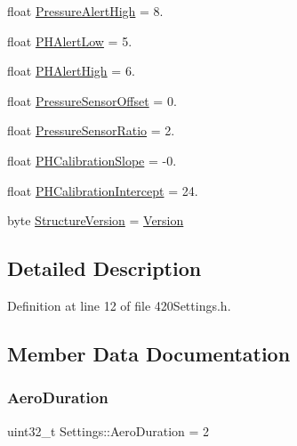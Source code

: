 \begin{DoxyCompactItemize}
\item 
float \mbox{\hyperlink{struct_settings_a8626ef35c32fefa3641eda2a0870e752}{Pressure\+Alert\+High}} = 8.
\item 
float \mbox{\hyperlink{struct_settings_a07b5f64fee695eab010c9e2e253cd683}{P\+H\+Alert\+Low}} = 5.
\item 
float \mbox{\hyperlink{struct_settings_a0b23f8b8b2d5d18b7b5a7b7802e98ce2}{P\+H\+Alert\+High}} = 6.
\item 
float \mbox{\hyperlink{struct_settings_acb268b606c3cf0917fb01044e051a112}{Pressure\+Sensor\+Offset}} = 0.
\item 
float \mbox{\hyperlink{struct_settings_af304b26ec1fe942717219db3fe959b4e}{Pressure\+Sensor\+Ratio}} = 2.
\item 
float \mbox{\hyperlink{struct_settings_af42cd4f0378498410447b2da93c0517f}{P\+H\+Calibration\+Slope}} = -\/0.
\item 
float \mbox{\hyperlink{struct_settings_a293248c61a8ef83275ab2881db22aa01}{P\+H\+Calibration\+Intercept}} = 24.
\item 
byte \mbox{\hyperlink{struct_settings_a923d0e7c37322a666726a4ca40b14aad}{Structure\+Version}} = \mbox{\hyperlink{420_settings_8h_a90337a28eda4a299ae1c1953e4440674}{Version}}
\end{DoxyCompactItemize}


\subsection{Detailed Description}


Definition at line 12 of file 420\+Settings.\+h.



\subsection{Member Data Documentation}
\mbox{\label{struct_settings_aab26c785fe46831f3af6c2486e944de7}} 
\subsubsection{\texorpdfstring{AeroDuration}{AeroDuration}}
{\footnotesize\ttfamily uint32\+\_\+t Settings\+::\+Aero\+Duration = 2}



